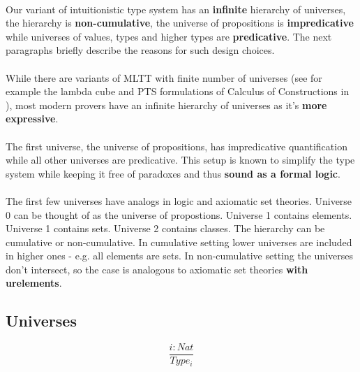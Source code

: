 \documentclass[11pt,oneside]{article}
\begin{document}
\paragraph{}
Our variant of intuitionistic type system has an {\bf infinite} hierarchy of universes,
the hierarchy is {\bf non-cumulative}, the universe of propositions is {\bf impredicative} while universes of values, types and higher types are {\bf predicative}. The next paragraphs briefly
describe the reasons for such design choices.

\paragraph{}
While there are variants of MLTT with finite number of universes (see
for example the lambda cube and PTS formulations of Calculus of
Constructions in \cite{henk1}), most modern provers have an infinite
hierarchy of universes as it's {\bf more expressive}.

\paragraph{}
The first universe, the universe of propositions, has impredicative quantification while all other universes are predicative. This setup
is known to simplify the type system while keeping it free of
paradoxes and thus {\bf sound as a formal logic}.

\paragraph{}
The first few universes have analogs in logic and axiomatic set theories.  Universe 0 can be thought of as the universe of propostions. Universe 1 contains elements.  Universe 1 contains sets. Universe 2 contains classes.  The hierarchy can be cumulative or non-cumulative. In cumulative
setting lower universes are included in higher ones - e.g. all elements
are sets. In non-cumulative setting the universes don't intersect,
so the case is analogous to axiomatic set theories {\bf with urelements}.

\subsection{Universes}

\begin{equation}
\tag{sorts}
\dfrac
  {i : Nat}
  {Type_i}
\end{equation}
\end{document}

